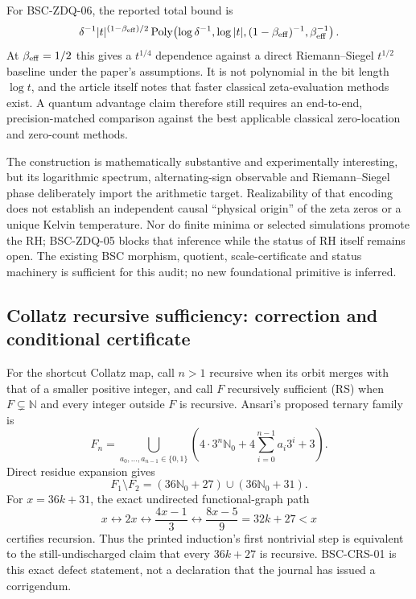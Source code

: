 \documentclass[11pt,a4paper]{article}
\theoremstyle{definition}
\theoremstyle{plain}
\theoremstyle{remark}
\begin{document}
For BSC-ZDQ-06, the reported total bound is
\[
 \delta^{-1}|t|^{(1-\beta_{\rm eff})/2}
 \operatorname{Poly}\!\left(\log\delta^{-1},\log|t|,
 (1-\beta_{\rm eff})^{-1},\beta_{\rm eff}^{-1}\right).
\]
At \(\beta_{\rm eff}=1/2\) this gives a \(t^{1/4}\) dependence against a
direct Riemann--Siegel \(t^{1/2}\) baseline under the paper's assumptions.
It is not polynomial in the bit length \(\log t\), and the article itself
notes that faster classical zeta-evaluation methods exist.  A quantum
advantage claim therefore still requires an end-to-end, precision-matched
comparison against the best applicable classical zero-location and zero-count
methods.

The construction is mathematically substantive and experimentally
interesting, but its logarithmic spectrum, alternating-sign observable and
Riemann--Siegel phase deliberately import the arithmetic target.  Realizability
of that encoding does not establish an independent causal ``physical origin''
of the zeta zeros or a unique Kelvin temperature.  Nor do finite minima or
selected simulations promote the RH; BSC-ZDQ-05 blocks that inference while
the status of RH itself remains open.  The existing BSC morphism, quotient,
scale-certificate and status machinery is sufficient for this audit; no new
foundational primitive is inferred.

\clearpage
\subsection{Collatz recursive sufficiency: correction and conditional
certificate}\label{sec:collatz-repair}

For the shortcut Collatz map, call \(n>1\) recursive when its orbit merges
with that of a smaller positive integer, and call \(F\) recursively sufficient
(RS) when \(F\subsetneq\mathbb N\) and every integer outside \(F\) is
recursive.  Ansari's proposed
ternary family \citep{ansari2025recursive} is
\[
 F_n=\bigcup_{a_0,\ldots,a_{n-1}\in\{0,1\}}
 \left(4\cdot3^n\mathbb N_0+
 4\sum_{i=0}^{n-1}a_i3^i+3\right).
\]
Direct residue expansion gives
\[
 F_1\setminus F_2
 =(36\mathbb N_0+27)\cup(36\mathbb N_0+31).
\]
For \(x=36k+31\), the exact undirected functional-graph path
\[
 x\longleftrightarrow2x
 \longleftrightarrow\frac{4x-1}{3}
 \longleftrightarrow\frac{8x-5}{9}=32k+27<x
\]
certifies recursion.  Thus the printed induction's first nontrivial step is
equivalent to the still-undischarged claim that every \(36k+27\) is
recursive.  BSC-CRS-01 is this exact defect statement, not a declaration
that the journal has issued a corrigendum.
\end{document}

